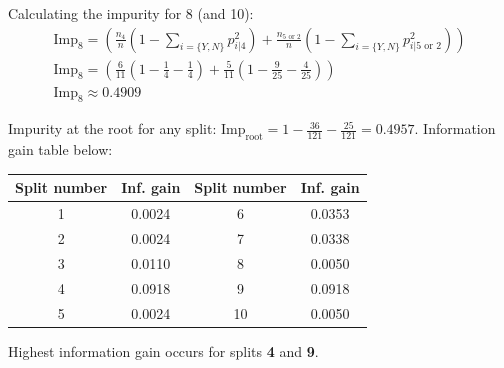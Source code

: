 \documentclass{article}
\begin{document}
\begin{flushleft}
Calculating the impurity for 8 (and 10):
\begin{gather*}
\text{Imp}_{8} = \left(\frac{n_{\text{4}}}{n} \left(1 - \sum_{i = \{Y, N\}} p_{i | \text{4}}^{2}\right) + \frac{n_{\text{5 or 2}}}{n} \left(1 - \sum_{i = \{Y, N\}} p_{i | \text{5 or 2}}^{2}\right)\right) \\
\text{Imp}_{8} = \left(\frac{6}{11} \left(1 - \frac{1}{4} - \frac{1}{4}\right) + \frac{5}{11} \left(1 - \frac{9}{25} - \frac{4}{25}\right)\right) \\
\text{Imp}_{8} \approx \mathbf{0.4909} 
\end{gather*}

Impurity at the root for any split:  \(\text{Imp}_{\text{root}} = \displaystyle 1 - \frac{36}{121} - \frac{25}{121} = \mathbf{0.4957}\).
Information gain table below:
\begin{center}
\begin{tabular}{|c|c|c|c|}
\hline
Split number & Inf. gain & Split number & Inf. gain \\
\hline
1 & 0.0024 & 6 & 0.0353 \\
\hline
2 & 0.0024 & 7 & 0.0338 \\
\hline
3 & 0.0110 & 8 & 0.0050 \\
\hline
4 & 0.0918 & 9 & 0.0918 \\
\hline
5 & 0.0024 & 10 & 0.0050 \\
\hline
\end{tabular}
\end{center}

Highest information gain occurs for splits \textbf{4} and \textbf{9}. 
\end{flushleft}
\end{document}
